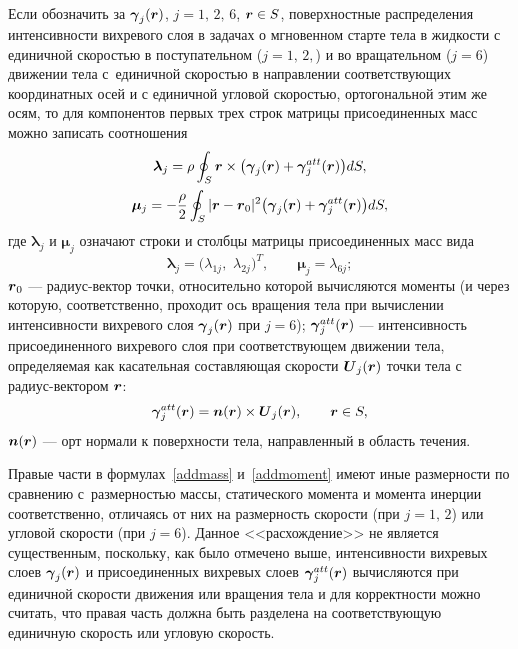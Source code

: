 \documentclass[12pt, a4paper]{article}
\renewcommand{\vec}[1]{\text{\mathversion{bold}${#1}$}}%
\begin{document}
Если обозначить за $\vec\gamma_{j}(\vec r)$, $j=1,\,2,\,6$, $\vec r \in S$,
поверхностные распределения интенсивности вихревого слоя в задачах о мгновенном старте тела в жидкости с единичной скоростью в поступательном ($j=1,\,2,$) и во вращательном ($j=6$) движении тела с~единичной скоростью в направлении соответствующих координатных осей и с единичной угловой скоростью, ортогональной этим же осям, то для компонентов первых трех строк матрицы присоединенных масс можно записать соотношения%
\begin{gather}
\label{addmass}
{\bm\lambda}_{j} = \rho \oint_S \vec r \times \bigl( \vec\gamma_j(\vec r) + \vec\gamma_j^{att}(\vec r) \bigr)dS,\\[0.4mm]
\label{addmoment}
{\bm\mu}_{j} = -\frac{\rho}{2} \oint_S |\vec r - \vec r_0|^2 \bigl( \vec\gamma_j(\vec r) + \vec\gamma_j^{att}(\vec r) \bigr)dS,
\end{gather}
где ${\bm\lambda}_{j}$ и ${\bm\mu}_{j}$ означают строки и столбцы матрицы присоединенных масс вида
\[
{\bm\lambda}_{j} = \bigl(\lambda_{1j},\,\,\lambda_{2j}\bigr)^T,
\qquad
{\bm\mu}_{j} = \lambda_{6j};
\]
$\vec r_0$ --- радиус-вектор точки, относительно которой вычисляются моменты (и через которую, соответственно, проходит ось вращения тела при вычислении интенсивности вихревого слоя $\vec\gamma_j(\vec r)$ при $j=6$);%
$\vec\gamma^{att}_j(\vec r)$ --- интенсивность присоединенного вихревого слоя при соответствующем движении тела, определяемая как касательная составляющая скорости $\vec U_j(\vec r)$ точки тела с радиус-вектором $\vec r$:
\[
\vec\gamma_j^{att}(\vec r) = \vec n(\vec r) \times \vec U_j(\vec r), \qquad \vec r \in S,
\]
$\vec n(\vec r)$ ---   орт нормали к поверхности тела, направленный в область течения.

\medskip

Правые части в формулах~\eqref{addmass} и~\eqref{addmoment} имеют иные размерности по сравнению с~размерностью массы, статического момента и момента инерции соответственно, отличаясь от них на размерность скорости (при $j=1,\,2$) или угловой скорости (при $j =6$).
Данное <<расхождение>> не является существенным, поскольку, как было отмечено выше, интенсивности вихревых слоев $\vec\gamma_j(\vec r)$ и присоединенных вихревых слоев $\vec\gamma_j^{att}(\vec r)$ вычисляются при единичной скорости движения или вращения тела и для корректности можно считать, что правая часть должна быть разделена на соответствующую единичную скорость или угловую скорость.
\end{document}
